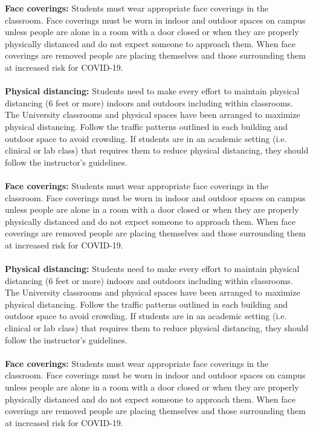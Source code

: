 \documentclass[11pt]{article}
\begin{document}
\textbf{Face coverings:} Students must wear appropriate face coverings in the classroom. Face coverings must be worn in indoor and outdoor spaces on campus unless people are alone in a room with a door closed or when they are properly physically distanced and do not expect someone to approach them. When face coverings are removed people are placing themselves and those surrounding them at increased risk for COVID-19.\\~\\
\textbf{Physical distancing:} Students need to make every effort to maintain physical distancing (6 feet or more) indoors and outdoors including within classrooms. The University classrooms and physical spaces have been arranged to maximize physical distancing. Follow the traffic patterns outlined in each building and outdoor space to avoid crowding. If students are in an academic setting (i.e. clinical or lab class) that requires them to reduce physical distancing, they should follow the instructor’s guidelines.\\~\\
\textbf{Face coverings:} Students must wear appropriate face coverings in the classroom. Face coverings must be worn in indoor and outdoor spaces on campus unless people are alone in a room with a door closed or when they are properly physically distanced and do not expect someone to approach them. When face coverings are removed people are placing themselves and those surrounding them at increased risk for COVID-19.\\~\\
\textbf{Physical distancing:} Students need to make every effort to maintain physical distancing (6 feet or more) indoors and outdoors including within classrooms. The University classrooms and physical spaces have been arranged to maximize physical distancing. Follow the traffic patterns outlined in each building and outdoor space to avoid crowding. If students are in an academic setting (i.e. clinical or lab class) that requires them to reduce physical distancing, they should follow the instructor’s guidelines.\\~\\
\textbf{Face coverings:} Students must wear appropriate face coverings in the classroom. Face coverings must be worn in indoor and outdoor spaces on campus unless people are alone in a room with a door closed or when they are properly physically distanced and do not expect someone to approach them. When face coverings are removed people are placing themselves and those surrounding them at increased risk for COVID-19.\\~\\
\end{document}
